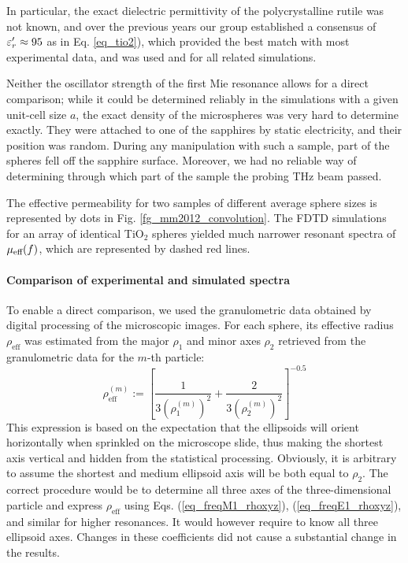 In particular, the exact dielectric permittivity of the polycrystalline rutile was not known, and over the previous years our group established a consensus of $\varepsilon_r' \approx 95$ as in Eq. \ref{eq_tio2}), which provided the best match with most experimental data, and was used and for all related simulations.

Neither the oscillator strength of the first Mie resonance allows for a direct comparison; while it could be determined reliably in the simulations with a given unit-cell size $a$, the exact density of the microspheres was very hard to determine exactly. They were attached to one of the sapphires by static electricity, and their position was random. During any manipulation with such a sample, part of the spheres fell off the sapphire surface. Moreover, we had no reliable way of determining through which part of the sample the probing THz beam passed.

The effective permeability for two samples of different average sphere sizes is represented by dots in Fig. \ref{fg_mm2012_convolution}. The FDTD simulations for an array of identical TiO$_{2}$ spheres yielded much narrower resonant spectra of $\mu_{\text{eff} }(f)$, which are represented by dashed red lines. 

\paragraph{Comparison of experimental and simulated spectra}%
To enable a direct comparison, we used the granulometric data obtained by digital processing of the microscopic images. For each sphere, its effective radius $\rho_{\text{eff}}$ was estimated from the major $\rho_1$ and minor axes $\rho_2$ retrieved from the granulometric data for the $m$-th particle: 
\begin{equation} \rho_{\text{eff}}^{(m)} := \left[\frac{1}{3\left(\rho_1^{(m)}\right)^2} + \frac{2}{3\left(\rho_2^{(m)}\right)^2}\right]^{-0.5} \label{eq_rhoconvol}\end{equation}
This expression is based on the expectation that the ellipsoids will orient horizontally when sprinkled on the microscope slide, thus making the shortest axis vertical and hidden from the statistical processing. Obviously, it is arbitrary to assume the shortest and medium ellipsoid axis will be both equal to $\rho_2$. 
The correct procedure would be to determine all three axes of the three-dimensional particle and express $\rho_{\text{eff}}$ using Eqs. (\ref{eq_freqM1_rhoxyz}), (\ref{eq_freqE1_rhoxyz}), and similar for higher resonances. It would however require to know all three ellipsoid axes. Changes in these coefficients did not cause a substantial change in the results.

